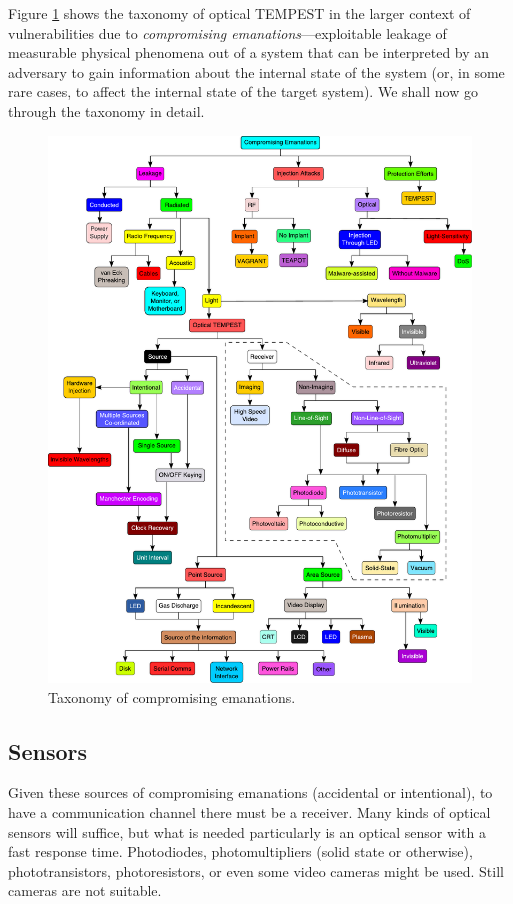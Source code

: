 \documentclass[a4paper,twoside,11pt]{book}
\begin{document}
Figure \ref{figure:taxonomy} shows the taxonomy of optical TEMPEST in the
larger context of vulnerabilities due to \emph{compromising
emanations}---exploitable leakage of measurable physical phenomena out of a
system that can be interpreted by an adversary to gain information about the
internal state of the system (or, in some rare cases, to affect the internal
state of the target system). We shall now go through the taxonomy in detail.
\begin{figure}[htp]
  \centering
  \includegraphics[width=\textwidth]{taxonomy.pdf}
  \caption{Taxonomy of compromising emanations.}
  \label{figure:taxonomy}
\end{figure}
\subsection{Sensors}
Given these sources of compromising emanations (accidental or intentional), to
have a communication channel there must be a receiver. Many kinds of optical
sensors will suffice, but what is needed particularly is an optical sensor with
a fast response time. Photodiodes, photomultipliers (solid state or otherwise),
phototransistors, photoresistors, or even some video cameras might be used.
Still cameras are not suitable.
\end{document}
